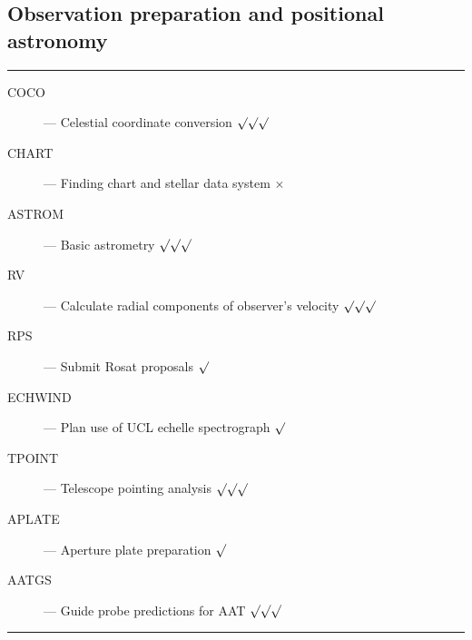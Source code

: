 \newpage

\subsection{Observation preparation and positional astronomy}

\rule{\textwidth}{0.5mm}
\begin{description}
\begin{description}
\item [COCO] --- Celestial coordinate conversion \hfill $\surd\surd\surd$
\item [CHART] --- Finding chart and stellar data system \hfill $\times$
\item [ASTROM] --- Basic astrometry \hfill $\surd\surd\surd$
\item [RV] --- Calculate radial components of observer's velocity \hfill 
 $\surd\surd\surd$
\item [RPS] --- Submit Rosat proposals \hfill $\surd$
\item [ECHWIND] --- Plan use of UCL echelle spectrograph \hfill $\surd$
\item [TPOINT] --- Telescope pointing analysis \hfill $\surd\surd\surd$
\item [APLATE] --- Aperture plate preparation \hfill $\surd$
\item [AATGS] --- Guide probe predictions for AAT \hfill $\surd\surd\surd$
\end{description}
\end{description}
\rule{\textwidth}{0.5mm}

